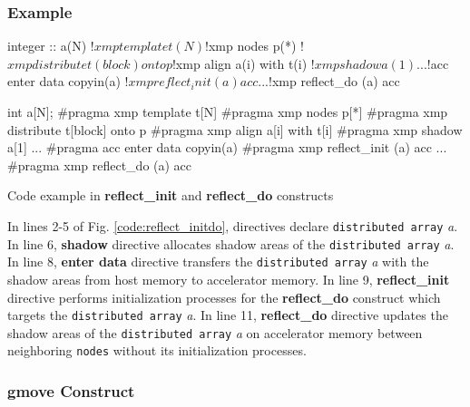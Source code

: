 \subsubsection*{Example}
\begin{myfigure}
\begin{minipage}{0.45\hsize}
\begin{center}
\begin{XACCFexampleL}
integer :: a(N)
!$xmp template t(N)
!$xmp nodes p(*)
!$xmp distribute t(block) onto p
!$xmp align a(i) with t(i)
!$xmp shadow a(1)
...
!$acc enter data copyin(a)
!$xmp reflect_init (a) acc
...
!$xmp reflect_do (a) acc
\end{XACCFexampleL}
\end{center}
\end{minipage}
%
\begin{minipage}{0.53\hsize}
\begin{center}
\begin{XACCCexampleR}
int a[N];
#pragma xmp template t[N]
#pragma xmp nodes p[*]
#pragma xmp distribute t[block] onto p
#pragma xmp align a[i] with t[i]
#pragma xmp shadow a[1]
...
#pragma acc enter data copyin(a)
#pragma xmp reflect_init (a) acc
...
#pragma xmp reflect_do (a) acc
\end{XACCCexampleR}
\end{center}
\end{minipage}
\caption{Code example in {\XACC} {\bf reflect\_init} and {\bf reflect\_do} constructs}\label{code:reflect_initdo}
\end{myfigure}

In lines 2-5 of Fig. \ref{code:reflect_initdo},
{\XMP} directives declare {\tt distributed array} {\it a}.
In line 6,
{\XMP} {\bf shadow} directive allocates shadow areas of the {\tt distributed array} {\it a}.
In line 8,
{\OACC} {\bf enter data} directive transfers the {\tt distributed array} {\it a} with the shadow areas from host memory to accelerator memory.
In line 9,
{\XACC} {\bf reflect\_init} directive performs initialization processes for the {\bf reflect\_do} construct which targets the {\tt distributed array} {\it a}.
In line 11,
{\XACC} {\bf reflect\_do} directive updates the shadow areas of the {\tt distributed array} {\it a} on accelerator memory between neighboring {\tt nodes}
without its initialization processes.

\subsubsection{gmove Construct}\label{sec:gmove}
